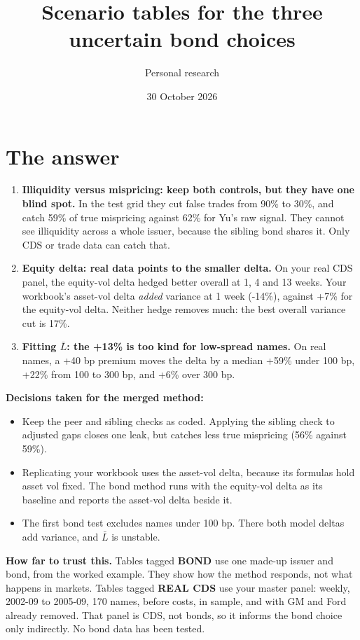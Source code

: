 \documentclass[10pt,a4paper]{article}
\title{Scenario tables for the three uncertain bond choices}\author{Personal research}\date{30 October 2026}
\begin{document}
\sloppy\maketitle

\section*{The answer}
\begin{enumerate}[leftmargin=*,itemsep=2pt]
\item \textbf{Illiquidity versus mispricing: keep both controls, but they have one blind spot.} In the test grid they cut false trades from 90\% to 30\%, and catch 59\% of true mispricing against 62\% for Yu's raw signal. They cannot see illiquidity across a whole issuer, because the sibling bond shares it. Only CDS or trade data can catch that.
\item \textbf{Equity delta: real data points to the smaller delta.} On your real CDS panel, the equity-vol delta hedged better overall at 1, 4 and 13 weeks. Your workbook's asset-vol delta \emph{added} variance at 1 week (-14\%), against +7\% for the equity-vol delta. Neither hedge removes much: the best overall variance cut is 17\%.
\item \textbf{Fitting $\bar L$: the +13\% is too kind for low-spread names.} On real names, a +40 bp premium moves the delta by a median +59\% under 100 bp, +22\% from 100 to 300 bp, and +6\% over 300 bp.
\end{enumerate}

\textbf{Decisions taken for the merged method:}
\begin{itemize}[leftmargin=*,itemsep=1pt]
\item Keep the peer and sibling checks as coded. Applying the sibling check to adjusted gaps closes one leak, but catches less true mispricing (56\% against 59\%).
\item Replicating your workbook uses the asset-vol delta, because its formulas hold asset vol fixed. The bond method runs with the equity-vol delta as its baseline and reports the asset-vol delta beside it.
\item The first bond test excludes names under 100 bp. There both model deltas add variance, and $\bar L$ is unstable.
\end{itemize}

\textbf{How far to trust this.} Tables tagged \textbf{BOND} use one made-up issuer and bond, from the worked example. They show how the method responds, not what happens in markets. Tables tagged \textbf{REAL CDS} use your master panel: weekly, 2002-09 to 2005-09, 170 names, before costs, in sample, and with GM and Ford already removed. That panel is CDS, not bonds, so it informs the bond choice only indirectly. No bond data has been tested.
\end{document}
